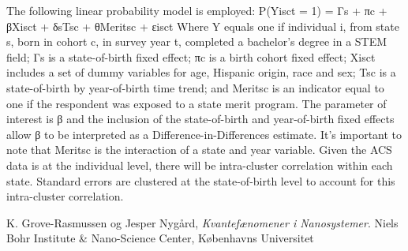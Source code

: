 \documentclass[a4paper]{article}
\begin{document}
The following linear probability model is employed:
P(Yisct = 1) = Γs + πc + βXisct + δsTsc + θMeritsc + εisct
Where Y equals one if individual i, from state s, born in cohort c, in survey year t, completed a bachelor’s degree in a STEM field; Γs is a state-of-birth fixed effect; πc is a birth cohort fixed effect; Xisct includes a set of dummy variables for age, Hispanic origin, race and sex; Tsc is a state-of-birth by year-of-birth time trend; and Meritsc is an indicator equal to one if the respondent was exposed to a state merit program. The parameter of interest is β and the inclusion of the state-of-birth and year-of-birth fixed effects allow β to be interpreted as a Difference-in-Differences estimate. It’s important to note that Meritsc is the interaction of a state and year variable. Given the ACS data is at the individual level, there will be intra-cluster correlation within each state. Standard errors are clustered at the state-of-birth level to account for this intra-cluster correlation. 

\begin{thebibliography}{9}
  K. Grove-Rasmussen og Jesper Nygård,
  \emph{Kvantefænomener i Nanosystemer}.
  Niels Bohr Institute \& Nano-Science Center, Københavns Universitet

\end{thebibliography}
\end{document}
